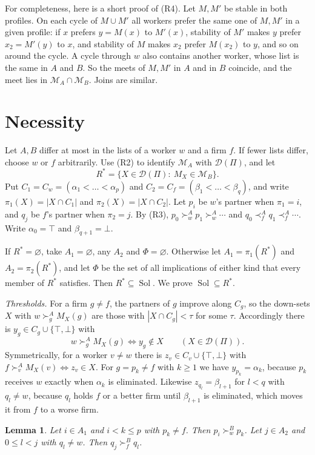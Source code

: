 \documentclass[11pt]{article}
\newtheorem{lemma}[theorem]{Lemma}
\theoremstyle{definition}
\theoremstyle{remark}
\newcommand{\D}{\mathcal D}
\newcommand{\Sol}{\operatorname{Sol}}
\begin{document}
For completeness, here is a short proof of (R4). Let $M,M'$ be stable in both profiles. On each cycle of $M\cup M'$ all workers prefer the same one of $M,M'$ in a given profile: if $x$ prefers $y=M(x)$ to $M'(x)$, stability of $M'$ makes $y$ prefer $x_2=M'(y)$ to $x$, and stability of $M$ makes $x_2$ prefer $M(x_2)$ to $y$, and so on around the cycle. A cycle through $w$ also contains another worker, whose list is the same in $A$ and $B$. So the meets of $M,M'$ in $A$ and in $B$ coincide, and the meet lies in $\mathcal M_A\cap\mathcal M_B$. Joins are similar.

\section{Necessity}

Let $A,B$ differ at most in the lists of a worker $w$ and a firm $f$. If fewer lists differ, choose $w$ or $f$ arbitrarily. Use (R2) to identify $\mathcal M_A$ with $\D(\Pi)$, and let
\[
R^*=\{X\in\D(\Pi):\ M_X\in\mathcal M_B\}.
\]
Put $C_1=C_w=(\alpha_1<\dots<\alpha_p)$ and $C_2=C_f=(\beta_1<\dots<\beta_q)$, and write $\pi_1(X)=|X\cap C_1|$ and $\pi_2(X)=|X\cap C_2|$. Let $p_i$ be $w$'s partner when $\pi_1=i$, and $q_j$ be $f$'s partner when $\pi_2=j$. By (R3), $p_0\succ^A_w p_1\succ^A_w\cdots$ and $q_0\prec^A_f q_1\prec^A_f\cdots$. Write $\alpha_0=\top$ and $\beta_{q+1}=\bot$.

If $R^*=\varnothing$, take $A_1=\varnothing$, any $A_2$ and $\Phi=\varnothing$. Otherwise let $A_1=\pi_1(R^*)$ and $A_2=\pi_2(R^*)$, and let $\Phi$ be the set of all implications of either kind that every member of $R^*$ satisfies. Then $R^*\subseteq\Sol$. We prove $\Sol\subseteq R^*$.

\emph{Thresholds.} For a firm $g\ne f$, the partners of $g$ improve along $C_g$, so the down-sets $X$ with $w\succ^A_g M_X(g)$ are those with $|X\cap C_g|<\tau$ for some $\tau$. Accordingly there is $y_g\in C_g\cup\{\top,\bot\}$ with
\[
 w\succ^A_g M_X(g)\iff y_g\notin X\qquad(X\in\D(\Pi)).
\]
Symmetrically, for a worker $v\ne w$ there is $z_v\in C_v\cup\{\top,\bot\}$ with $f\succ^A_v M_X(v)\iff z_v\in X$. For $g=p_k\ne f$ with $k\ge1$ we have $y_{p_k}=\alpha_k$, because $p_k$ receives $w$ exactly when $\alpha_k$ is eliminated. Likewise $z_{q_l}=\beta_{l+1}$ for $l<q$ with $q_l\ne w$, because $q_l$ holds $f$ or a better firm until $\beta_{l+1}$ is eliminated, which moves it from $f$ to a worse firm.

\begin{lemma}\label{lem:order}
Let $i\in A_1$ and $i<k\le p$ with $p_k\ne f$. Then $p_i\succ^B_w p_k$. Let $j\in A_2$ and $0\le l<j$ with $q_l\ne w$. Then $q_j\succ^B_f q_l$.
\end{lemma}
\end{document}
